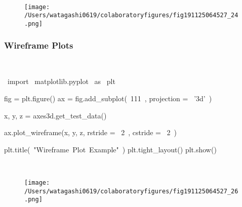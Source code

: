 \begin{paracol}{2}
\begin{cellExecute}[escapechar=~]
~~
\end{cellExecute}
\switchcolumn
\begin{resultCell}[escapechar=~]
\end{resultCell}
\end{paracol}

\begin{figure}[H]
\centering
\texttt{[image: /Users/watagashi0619/colaboratoryfigures/fig191125064527\_24.png]}
\end{figure}
\subsubsection{Wireframe Plots}

\begin{paracol}{2}
\smallskip
\begin{cellExecute}[escapechar=~]
~~
\end{cellExecute}
\switchcolumn
\begin{codeCell}[escapechar=~]
~\textcolor{mtk17}{import}~ matplotlib.pyplot ~\textcolor{mtk17}{as}~ plt

fig = plt.figure()
ax = fig.add_subplot(~\textcolor{mtk7}{111}~, projection = ~\textcolor{mtk25}{'3d'}~)

x, y, z = axes3d.get_test_data()

ax.plot_wireframe(x, y, z, rstride = ~\textcolor{mtk7}{2}~, cstride = ~\textcolor{mtk7}{2}~)

plt.title(~\textcolor{mtk25}{"Wireframe Plot Example"}~)
plt.tight_layout()
plt.show()
\end{codeCell}
\end{paracol}

\begin{paracol}{2}
\begin{cellExecute}[escapechar=~]
~~
\end{cellExecute}
\switchcolumn
\begin{resultCell}[escapechar=~]
\end{resultCell}
\end{paracol}

\begin{figure}[H]
\centering
\texttt{[image: /Users/watagashi0619/colaboratoryfigures/fig191125064527\_26.png]}
\end{figure}
